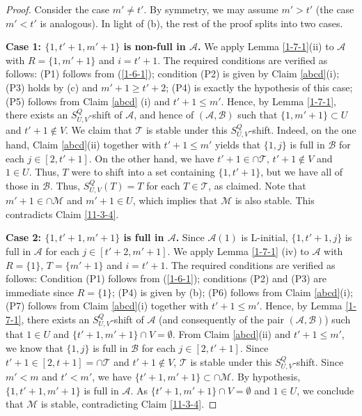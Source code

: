 \documentclass[11pt]{article}
\newcommand{\m}{\mathcal}
\begin{document}
\begin{proof}
Consider the case $m' \ne t'$. By symmetry, we may assume $m' > t'$ (the case $m' < t'$ is analogous).  
In light of (b), the rest of the proof splits into two cases.

{\bf Case 1: $\{1,t'+1,m'+1\}$  is non-full in $\m A$.} We apply Lemma \ref{1-7-1}(ii) to $\m A$ with $R=\{1, m'+1\}$ and $i=t'+1$.  
The required conditions are verified as follows: (P1) follows from (\ref{1-6-1});   condition (P2) is given by Claim \ref{abcd}(i); (P3) holds by (c) and $m'+1\ge t'+2$; (P4) is exactly the hypothesis of this case; (P5) follows from Claim \ref{abcd} (i) and $t'+1\le m'$. 
Hence, by Lemma \ref{1-7-1}, there exists an $S^Q_{U,V}$-shift of $\m A$, and hence of $(\m A, \m B)$ such that $\{1,m'+1\}\subset U$ and $t'+1\not\in V$. We claim that $\m T$ is stable under this $S^Q_{U,V}$-shift. Indeed, on the one hand, Claim \ref{abcd}(ii) together with $t'+1\le m'$ yields that $\{1,j\}$ is full in $\m B$ for each $j\in [2,t'+1]$. On the other hand, we have $t'+1\in \cap \m T$, $t'+1\not\in V$ and $1\in U$. Thus, $T$ were to shift into a set containing $\{1,t'+1\}$, but we have all of those in $\m B.$ Thus, $S_{U,V}^Q (T)=T$ for each $T\in \m T$, as claimed.  
Note that $m'+1\in \cap \m M$ and $m'+1\in U$, which implies that $\m M$ is also stable. This contradicts Claim \ref{11-3-4}. 


{\bf Case 2: $\{1,t'+1,m'+1\}$  is full in $\m A$.}
Since $\m A(1)$ is L-initial, $\{1,t'+1,j\}$  is full in $\m A$ for each $j\in [t'+2, m'+1]$. 
We apply Lemma \ref{1-7-1} (iv) to $\m A$ with $R=\{1\}$, $T=\{m'+1\}$ and $i=t'+1$. 
The required conditions are verified as follows: 
Condition (P1) follows from (\ref{1-6-1});
conditions (P2) and (P3) are immediate since $R=\{1\}$; (P4) is given by (b); (P6) follows from Claim \ref{abcd}(i); (P7) follows from Claim \ref{abcd}(i) together with $t'+1\le m'$. 
Hence, by Lemma \ref{1-7-1}, there exists an $S^Q_{U,V}$-shift of $\m A$ (and consequently of the pair $(\m A, \m B)$) such that $1\in U$ and $\{t'+1,m'+1\}\cap V=\emptyset$. 
From Claim \ref{abcd}(ii) and $t'+1\le m'$, we know that $\{1,j\}$ is full in $\m B$ for each $j\in [2,t'+1]$. 
Since $t'+1 \in [2,t+1]= \cap \m T$ and $t'+1\not\in V$, 
$\m T$ is stable under this $S^Q_{U,V}$-shift. 
Since $m'<m$ and $t'<m'$, we have $\{t'+1, m'+1\} \subset \cap \mathcal{M}$. By hypothesis, $\{1, t'+1, m'+1\}$ is full in $\mathcal{A}$. 
As $\{t'+1,m'+1\}\cap V=\emptyset$ and $1\in U$, we conclude that  $\m M$ is stable, contradicting Claim \ref{11-3-4}.
\end{proof}
\end{document}
